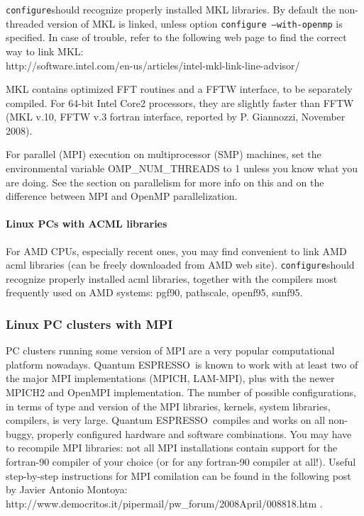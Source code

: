 \documentclass[12pt,a4paper]{article}
\def\qe{{\sc Quantum ESPRESSO}}
\def\configure{\texttt{configure}}
\begin{document}
\configure should recognize properly installed MKL libraries.
By default the non-threaded version of MKL is linked, unless option
\texttt{configure --with-openmp} is specified. In case of trouble,
refer to the following web page to find the correct way to link MKL:\\
http://software.intel.com/en-us/articles/intel-mkl-link-line-advisor/

MKL contains optimized FFT routines and a FFTW interface, to be separately
compiled. For 64-bit Intel Core2 processors, they are slightly faster than 
FFTW (MKL v.10, FFTW v.3 fortran interface, reported by P. Giannozzi,
November 2008). 

For parallel (MPI) execution on multiprocessor (SMP) machines, set the
environmental variable OMP\_NUM\_THREADS to 1 unless you know what you 
are doing. See the section  on parallelism for more info on this
and on the difference between MPI and OpenMP parallelization. 

\paragraph{Linux PCs with ACML libraries}
For AMD CPUs, especially recent ones, you may find convenient to 
link AMD acml libraries (can be freely downloaded from AMD web site). 
\configure should recognize properly installed acml libraries,
together with the compilers most frequently used on AMD systems:
pgf90, pathscale, openf95, sunf95.

\subsubsection{Linux PC clusters with MPI}
\label{SubSec:LinuxPCMPI}
PC clusters running some version of MPI are a very popular
computational platform nowadays. \qe\ is known to work
with at least two of the major MPI implementations (MPICH, LAM-MPI),
plus with the newer MPICH2 and OpenMPI implementation. The number of
possible configurations, in terms of type and version of the MPI
libraries, kernels, system libraries, compilers, is very
large. \qe\ compiles and works on all non-buggy, properly
configured hardware and software combinations. You may have to
recompile MPI libraries: not all MPI installations contain support for
the fortran-90 compiler of your choice (or for any fortran-90 compiler
at all!). Useful step-by-step instructions for MPI comilation can be 
found in the following post by  Javier Antonio Montoya:\\
http://www.democritos.it/pipermail/pw\_forum/2008April/008818.htm . 
\end{document}
